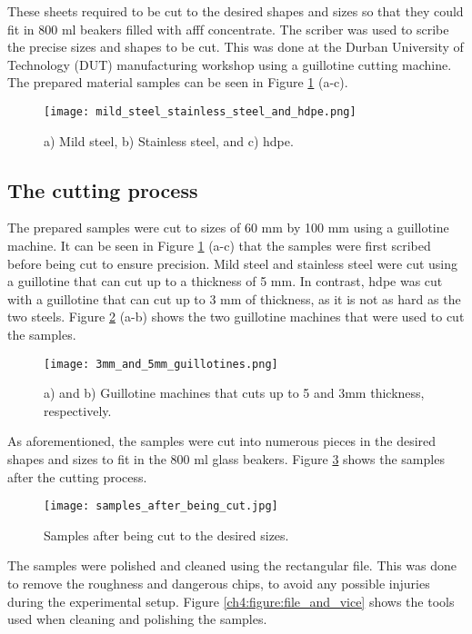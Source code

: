These sheets required to be cut to the desired shapes and sizes so that they could fit in 800 ml beakers filled with \acrshort{afff} concentrate. The scriber was used to scribe the precise sizes and shapes to be cut. This was done at the Durban University of Technology (DUT) manufacturing workshop using a guillotine cutting machine. The prepared material samples can be seen in Figure \ref{ch4:figure:samples} (a-c).

\begin{figure}[H]
    \texttt{[image: mild\_steel\_stainless\_steel\_and\_hdpe.png]}
    \caption{a) Mild steel, b) Stainless steel, and c) \acrshort{hdpe}.}
    \label{ch4:figure:samples}
\end{figure}

\subsection{The cutting process}
The prepared samples were cut to sizes of 60 mm by 100 mm using a guillotine machine. It can be seen in Figure \ref{ch4:figure:samples} (a-c) that the samples were first scribed before being cut to ensure precision. Mild steel and stainless steel were cut using a guillotine that can cut up to a thickness of 5 mm. In contrast, \acrshort{hdpe} was cut with a guillotine that can cut up to 3 mm of thickness, as it is not as hard as the two steels. Figure \ref{ch4:figure:guillotines} (a-b) shows the two guillotine machines that were used to cut the samples.

\begin{figure}[H]
    \centering
    \texttt{[image: 3mm\_and\_5mm\_guillotines.png]}
    \caption{a) and b) Guillotine machines that cuts up to 5 and 3mm thickness, respectively.}
    \label{ch4:figure:guillotines}
\end{figure}

As aforementioned, the samples were cut into numerous pieces in the desired shapes and sizes to fit in the 800 ml glass beakers. Figure \ref{ch4:figure:samples_cut} shows the samples after the cutting process.

\begin{figure}[H]
    \centering
    \texttt{[image: samples\_after\_being\_cut.jpg]}
    \caption{Samples after being cut to the desired sizes.}
    \label{ch4:figure:samples_cut}
\end{figure}

The samples were polished and cleaned using the rectangular file. This was done to remove the roughness and dangerous chips, to avoid any possible injuries during the experimental setup. Figure \ref{ch4:figure:file_and_vice} shows the tools used when cleaning and polishing the samples.
 
